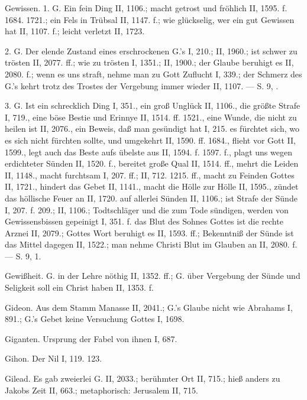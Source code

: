 Gewissen. 1.  G. Ein fein Ding II, 1106.; macht getrost und fröhlich II, 1595. f. 1684. 1721.; ein Fels in Trübsal II, 1147. f.; wie glückselig, wer ein gut Gewissen hat II, 1107. f.; leicht verletzt II, 1723.

2.  G. Der elende Zustand eines erschrockenen G.’s I, 210.; II, 1960.; ist schwer zu trösten II, 2077. ff.; wie zu trösten I, 1351.; II, 1900.; der Glaube beruhigt es II, 2080. f.; wenn es uns straft, nehme man zu Gott Zuflucht I, 339.; der Schmerz des G.’s kehrt trotz des Trostes der Vergebung immer wieder II, 1107. — S.  9, .

3.  G. Ist ein schrecklich Ding I, 351., ein groß Unglück II, 1106., die größte Strafe I, 719., eine böse Bestie und Erinnye II, 1514. ff. 1521., eine Wunde, die nicht zu heilen ist II, 2076., ein Beweis, daß man gesündigt hat I, 215.  es fürchtet sich, wo es sich nicht fürchten sollte, und umgekehrt II, 1590. ff. 1684., flieht vor Gott II, 1599., legt auch das Beste aufs übelste aus II, 1594. f. 1597. f., plagt uns wegen erdichteter Sünden II, 1520. f., bereitet große Qual II, 1514. ff., mehrt die Leiden II, 1148., macht furchtsam I, 207. ff.; II, 712. 1215. ff., macht zu Feinden Gottes II, 1721., hindert das Gebet II, 1141., macht die Hölle zur Hölle II, 1595., zündet das höllische Feuer an II, 1720.  auf allerlei Sünden II, 1106.; ist Strafe der Sünde I, 207. f. 209.; II, 1106.; Todtschläger und die zum Tode sündigen, werden von Gewissensbissen gepeinigt I, 351. f.  das Blut des Sohnes Gottes ist die rechte Arznei II, 2079.; Gottes Wort beruhigt es II, 1593. ff.; Bekenntniß der Sünde ist das Mittel dagegen II, 1522.; man nehme Christi Blut im Glauben an II, 2080. f. — S.  9,  1.

Gewißheit. G. in der Lehre nöthig II, 1352. ff.; G. über Vergebung der Sünde und Seligkeit soll ein Christ haben II, 1353. f.

Gideon. Aus dem Stamm Manasse II, 2041.; G.’s Glaube nicht wie Abrahams I, 891.; G.’s Gebet keine Versuchung Gottes I, 1698.

Giganten. Ursprung der Fabel von ihnen I, 687.

Gihon. Der Nil I, 119. 123.

Gilead. Es gab zweierlei G. II, 2033.; berühmter Ort II, 715.; hieß anders zu Jakobs Zeit II, 663.; metaphorisch: Jerusalem II, 715.

